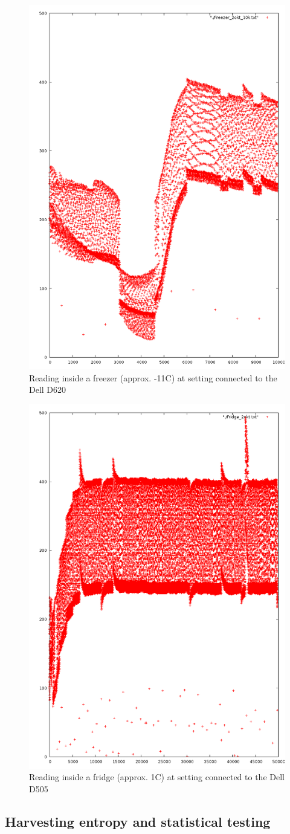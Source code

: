 \documentclass[a4paper]{article}           %
\begin{document}
\begin{figure}[h!]
  \centering  
  \includegraphics[width=0.5\columnwidth]{img/Freezer10k.png}
  \caption{Reading inside a freezer (approx. -11C) at setting connected to the Dell D620}
  \label{fig:ard1freezer}
\end{figure}
  
\begin{figure}[h!]
  \centering  
  \includegraphics[width=0.5\columnwidth]{img/Fridge50k.png}
  \caption{Reading inside a fridge (approx. 1C) at setting connected to the Dell D505}
  \label{fig:ard1fridge}
\end{figure}

 


\FloatBarrier
\subsection{Harvesting entropy and statistical testing}
\end{document}
